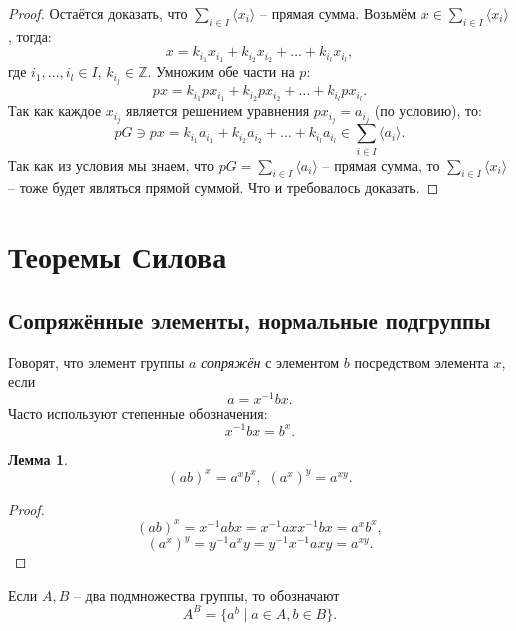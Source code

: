 \documentclass{article}
\newtheorem{lemma}{Лемма}[section]
\begin{document}
\begin{proof}
    Остаётся доказать, что $ \sum_{i \in I} \langle x_i \rangle $ -- прямая сумма. Возьмём $x \in \sum_{i \in I} \langle x_i \rangle $, тогда: $$ x = k_{i_1} x_{i_1} + k_{i_2} x_{i_2} + \ldots + k_{i_l} x_{i_l}, $$ где $i_1, \ldots, i_l \in I$, $k_{i_j} \in \mathbb{Z}$. Умножим обе части на $p$: $$ px = k_{i_1} p x_{i_1} + k_{i_2} p x_{i_2} + \ldots + k_{i_l} p x_{i_l}. $$ Так как каждое $x_{i_j}$ является решением уравнения $p x_{i_j} = a_{i_j}$ (по условию), то: $$ pG \ni px = k_{i_1} a_{i_1} + k_{i_2} a_{i_2} + \ldots + k_{i_l} a_{i_l} \in \sum_{i \in I} \langle a_i \rangle. $$ Так как из условия мы знаем, что $ pG = \sum_{i \in I} \langle a_i \rangle $ -- прямая сумма, то $ \sum_{i \in I} \langle x_i \rangle $ -- тоже будет являться прямой суммой. Что и требовалось доказать.
\end{proof}

\section{Теоремы Силова}

\subsection*{Сопряжённые элементы, нормальные подгруппы}

Говорят, что элемент группы $a$ \textit{сопряжён} с элементом $b$ посредством элемента $x$, если $$ a = x^{-1} b x. $$ Часто используют степенные обозначения: $$ x^{-1} b x = b^x. $$

\begin{lemma}
    $$ (ab)^x = a^x b^x, \, \, (a^x)^y = a^{xy}. $$
\end{lemma}
\begin{proof}
    $$ (ab)^x = x^{-1}abx = x^{-1}a x x^{-1} b x = a^x b^x, $$
    $$ (a^x)^y = y^{-1} a^x y = y^{-1} x^{-1} a x y = a^{xy}. $$
\end{proof}

Если $A, B$ -- два подмножества группы, то обозначают $$ A^B = \{ a^b \mid a\in A, b \in B \}. $$
\end{document}
